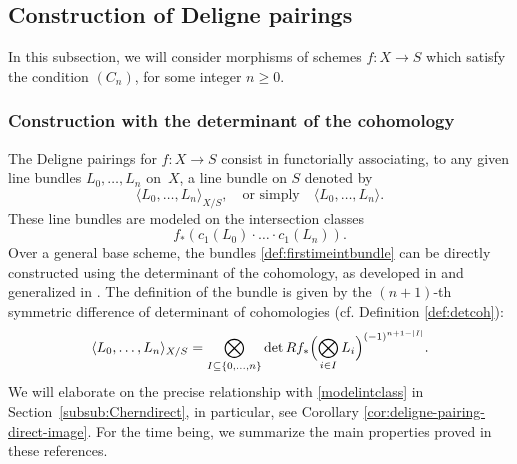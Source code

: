 \documentclass[11pt]{article}
\newcommand{\cf}{cf.\xspace}
\theoremstyle{plain}
\theoremstyle{definition}
\begin{document}
\subsection{Construction of Deligne pairings}\label{subsec:Deligne-pairings} In this subsection, we will consider morphisms of schemes $f\colon X \to S$ which satisfy the condition $(C_n)$, for some integer $n\geq 0$.

\subsubsection{Construction with the determinant of the cohomology}

The Deligne pairings for $f\colon X\to S$ consist in functorially associating, to any given line bundles $L_{0},\ldots, L_{n}$ on~$X$, a line bundle on $S$ denoted by
\begin{equation} \label{def:firstimeintbundle}
\langle L_0, \ldots, L_n \rangle_{X/S},\quad\text{or simply}\quad\langle L_0, \ldots, L_n \rangle.
\end{equation}
These line bundles are modeled on the intersection classes
\begin{equation}\label{modelintclass}
f_\ast (c_1(L_0)\cdot \ldots\cdot c_1(L_n) ).
\end{equation}
Over a general base scheme, the bundles \eqref{def:firstimeintbundle} can be directly constructed using the determinant of the cohomology, as developed in \cite{Ducrot} and generalized in \cite[App.]{Boucksom-Eriksson}. The definition of the bundle is given by the $(n+1)$-th symmetric difference of determinant of cohomologies (\cf Definition \ref{def:detcoh}):
\begin{equation}\label{eq:definition-ducrot}
\langle L_0, \ldots, L_n \rangle_{X/S} = \bigotimes_{I \subseteq \{0, \ldots, n \}} \det Rf_* \Bigl( \bigotimes_{i \in I} L_i \Bigr)^{(-1)^{n+1-|I|}}.
\end{equation}
We will elaborate on the precise relationship with \eqref{modelintclass} in Section~\ref{subsub:Cherndirect}, in particular, see Corollary \ref{cor:deligne-pairing-direct-image}. For the time being, we summarize the main properties proved in these references.
\end{document}
